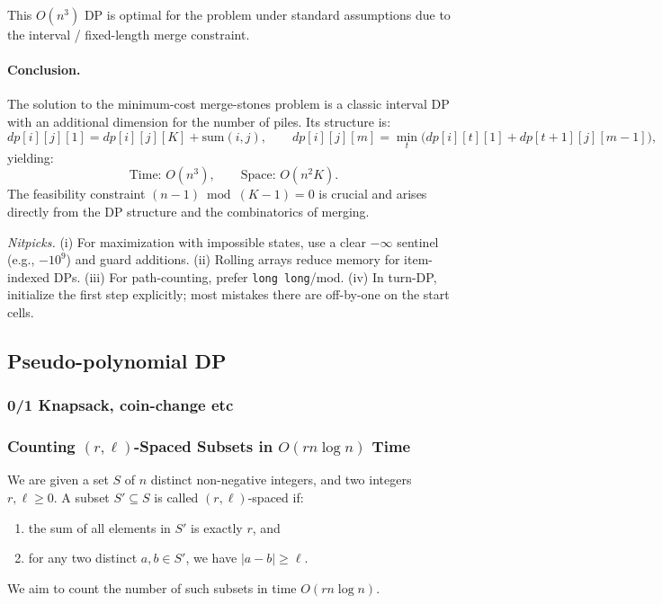 \documentclass[9pt]{extarticle}
\begin{document}
This $O(n^3)$ DP is optimal for the problem under standard assumptions due to the interval / fixed-length merge constraint.

\paragraph{Conclusion.}
The solution to the minimum-cost merge-stones problem is a classic interval DP with an additional dimension for the number of piles. Its structure is:
\[
  dp[i][j][1] = dp[i][j][K] + \text{sum}(i,j), \qquad
  dp[i][j][m] = \min_{t} \bigl( dp[i][t][1] + dp[t+1][j][m-1] \bigr),
\]
yielding:
\[
  \text{Time: } O(n^3), \qquad
  \text{Space: } O(n^2K).
\]
The feasibility constraint $(n-1) \bmod (K-1) = 0$ is crucial and arises directly from the DP structure and the combinatorics of merging.

\vspace{4pt}
\noindent\textit{Nitpicks.} 
(i) For maximization with impossible states, use a clear \(-\infty\) sentinel (e.g., \(-10^9\)) and guard additions. 
(ii) Rolling arrays reduce memory for item-indexed DPs. 
(iii) For path-counting, prefer \texttt{long long}/mod. 
(iv) In turn-DP, initialize the first step explicitly; most mistakes there are off-by-one on the start cells.

\subsection{Pseudo-polynomial DP}
\subsubsection{0/1 Knapsack, coin-change etc}
\subsubsection{Counting $(r,\ell)$-Spaced Subsets in $O(rn \log n)$ Time}

We are given a set \(S\) of \(n\) distinct non-negative integers, and two integers
\(r,\ell \ge 0\). A subset \(S' \subseteq S\) is called \((r,\ell)\)-spaced if:
\begin{enumerate}
    \item the sum of all elements in \(S'\) is exactly \(r\), and
    \item for any two distinct \(a,b \in S'\), we have \(|a-b| \ge \ell\).
\end{enumerate}
We aim to count the number of such subsets in time \(O(rn \log n)\).
\end{document}
